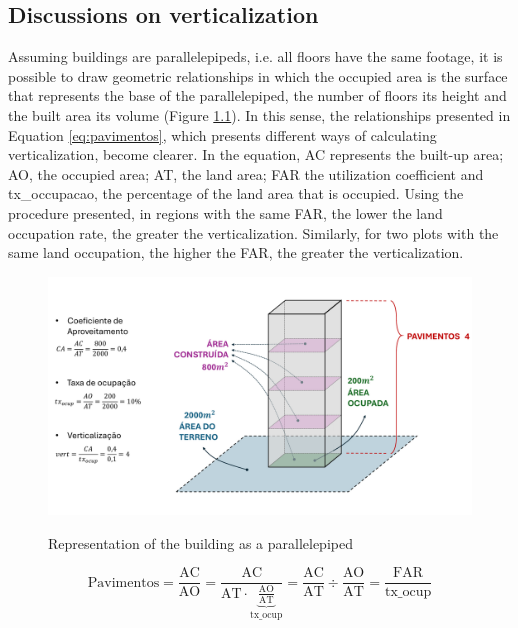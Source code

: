 \begin{apendicesenv}

    \partapendices
    
    \chapter{Discussions on verticalization}
    \label{appendix:verticalization}
    
    Assuming buildings are parallelepipeds, i.e. all floors have the same footage, it is possible to draw geometric relationships in which the occupied area is the surface that represents the base of the parallelepiped, the number of floors its height and the built area its volume (Figure \ref{fig:desenho}). In this sense, the relationships presented in Equation \ref{eq:pavimentos}, which presents different ways of calculating verticalization, become clearer. In the equation, AC represents the built-up area; AO, the occupied area; AT, the land area; FAR the utilization coefficient and tx\_occupacao, the percentage of the land area that is occupied. Using the procedure presented, in regions with the same FAR, the lower the land occupation rate, the greater the verticalization. Similarly, for two plots with the same land occupation, the higher the FAR, the greater the verticalization.
    
    \begin{figure}[h]
        \centering
        \caption{Representation of the building as a parallelepiped}
        \includegraphics[width = \linewidth]{figuras/desenho.pdf}
        \label{fig:desenho}
    \end{figure}
    
    \begin{equation}
        \text{Pavimentos}=\frac{\text{AC}}{\text{AO}}=\frac{\text{AC}}{\text{AT}\cdot\underbrace{\frac{\text{AO}}{\text{AT}}}_\text{tx\_ocup}}=\frac{\text{AC}}{\text{AT}}\div\frac{\text{AO}}{\text{AT}}=\frac{\text{FAR}}{\text{tx\_ocup}}
        \label{eq:pavimentos}
    \end{equation}
        

\end{apendicesenv}
